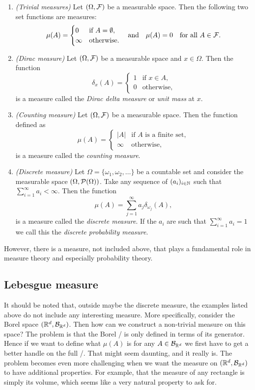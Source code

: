 \begin{example}
\hfil
\begin{enumerate}
\item \textit{(Trivial measures)} Let $(\Omega, \mathcal F)$ be a measurable space. Then the following two set functions are measures:
\[
	\mu(A) = \begin{cases}
		0 &\text{if } A = \emptyset, \\
		\infty &\text{otherwise.}
	\end{cases}
	\quad \text{and} \quad
	\mu(A) = 0 \quad \text{for all } A \in \mathcal F.
\]
\item \textit{(Dirac measure)} Let $(\Omega, \mathcal F)$ be a measurable space and $x \in \Omega$. Then the function
\[
	\delta_x(A) = \begin{cases}
		1 &\text{if } x \in A, \\
		0 &\text{otherwise},
	\end{cases}
\]
is a measure called the \emph{Dirac delta measure} or \emph{unit mass} at $x$.
\item \textit{(Counting measure)} Let $(\Omega, \mathcal F)$ be a measurable space. Then the function defined as
\[
	\mu(A) = \begin{cases}
		|A| &\text{if $A$ is a finite set},\\
		\infty &\text{otherwise}, 
	\end{cases}
\]
is a measure called the \emph{counting measure}.
\item \textit{(Discrete measure)} Let $\Omega = \{\omega_1, \omega_2, \dots\}$ be a countable set and consider the measurable space $(\Omega, \mathcal P(\Omega))$. Take any sequence of $(a_i)_{i \in \mathbb N}$ such that $\sum_{i = 1}^\infty a_i < \infty$. Then the function
\[
	\mu(A) = \sum_{j = 1}^\infty a_j \delta_{\omega_j}(A),
\]
is a measure called the \emph{discrete measure}. If the $a_i$ are such that $\sum_{i = 1}^\infty a_i = 1$ we call this the \emph{discrete probability measure}.
\end{enumerate}
\end{example}

However, there is a measure, not included above, that plays a fundamental role in measure theory and especially probability theory.

\subsection{Lebesgue measure}

It should be noted that, outside maybe the discrete measure, the examples listed above do not include any interesting measure. More specifically, consider the Borel space $(\mathbb R^d, \mathcal B_{\mathbb R^d})$. Then how can we construct a non-trivial measure on this space? The problem is that the Borel \sigalg/ is only defined in terms of its generator. Hence if we want to define what $\mu(A)$ is for any $A \in \mathcal B_{\mathbb R^d}$ we first have to get a better handle on the full \sigalg/. That might seem daunting, and it really is. The problem becomes even more challenging when we want the measure on $(\mathbb R^d, \mathcal B_{\mathbb R^d})$ to have additional properties. For example, that the measure of any rectangle is simply its volume, which seems like a very natural property to ask for. 

